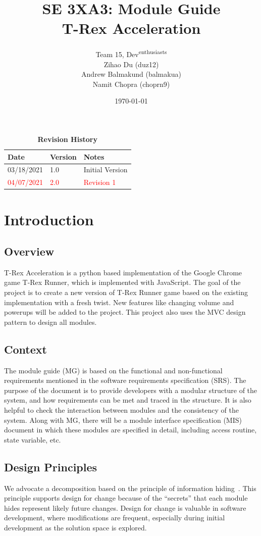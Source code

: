 \documentclass[12pt, titlepage]{article}
\title{SE 3XA3: Module Guide\\T-Rex Acceleration}
\author{Team 15, Dev\textsuperscript{enthusiasts}
		\\ Zihao Du (duz12)
		\\ Andrew Balmakund (balmakua) 
		\\ Namit Chopra (choprn9)
}
\date{\today}
\begin{document}
\maketitle

\tableofcontents
\listoftables
\listoffigures

\begin{table}[bp]
\caption{\bf Revision History}
\begin{tabularx}{\textwidth}{p{3cm}p{2cm}X}
\toprule {\bf Date} & {\bf Version} & {\bf Notes}\\
\midrule
03/18/2021 & 1.0 & Initial Version\\
\textcolor{red}{04/07/2021} & \textcolor{red}{2.0} & \textcolor{red}{Revision 1}\\
\bottomrule
\end{tabularx}
\end{table}

\newpage


\section{Introduction}
\subsection*{Overview}
T-Rex Acceleration is a python based implementation of the Google Chrome game T-Rex Runner, which is implemented with JavaScript. The goal of the project is to create a new version of T-Rex Runner game based on the existing implementation with a fresh twist. New features like changing volume and powerups will be added to the project. This project also uses the MVC design pattern to design all modules.
\subsection*{Context}
The module guide (MG) is based on the functional and non-functional requirements mentioned in the software requirements specification (SRS). The purpose of the document is to provide developers with a modular structure of the system, and how requirements can be met and traced in the structure. It is also helpful to check the interaction between modules and the consistency of the system. Along with MG, there will be a module interface specification (MIS) document in which these modules are specified in detail, including access routine, state variable, etc.
\subsection*{Design Principles}
We advocate a decomposition based on the principle of information hiding~\citep{Parnas1972a}. This
principle supports design for change because of the ``secrets'' that each module hides represent likely future changes. Design for change is valuable in software development, where modifications are frequent, especially during initial development as the solution space is explored.  
\end{document}

